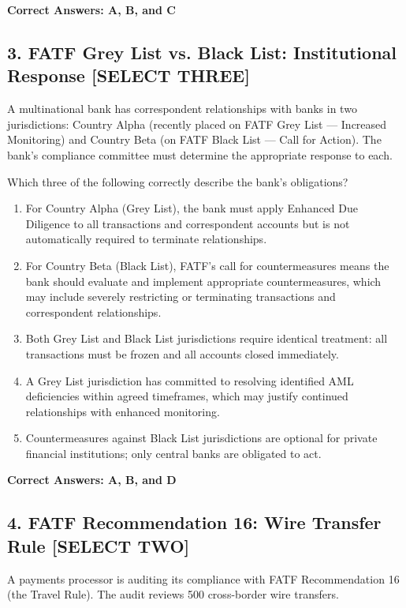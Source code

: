\documentclass[11pt,a4paper]{article}
\begin{document}
	\textbf{Correct Answers: A, B, and C}
	
	\subsection{3. FATF Grey List vs. Black List: Institutional Response \textnormal{[SELECT THREE]}}
	
	A multinational bank has correspondent relationships with banks in two jurisdictions: Country Alpha (recently placed on FATF Grey List — Increased Monitoring) and Country Beta (on FATF Black List — Call for Action). The bank's compliance committee must determine the appropriate response to each.
	
	Which three of the following correctly describe the bank's obligations?
	
	\begin{enumerate}[label=\Alph*.]
		\item For Country Alpha (Grey List), the bank must apply Enhanced Due Diligence to all transactions and correspondent accounts but is not automatically required to terminate relationships.
		\item For Country Beta (Black List), FATF's call for countermeasures means the bank should evaluate and implement appropriate countermeasures, which may include severely restricting or terminating transactions and correspondent relationships.
		\item Both Grey List and Black List jurisdictions require identical treatment: all transactions must be frozen and all accounts closed immediately.
		\item A Grey List jurisdiction has committed to resolving identified AML deficiencies within agreed timeframes, which may justify continued relationships with enhanced monitoring.
		\item Countermeasures against Black List jurisdictions are optional for private financial institutions; only central banks are obligated to act.
	\end{enumerate}
	
	\textbf{Correct Answers: A, B, and D}
	
	\subsection{4. FATF Recommendation 16: Wire Transfer Rule \textnormal{[SELECT TWO]}}
	
	A payments processor is auditing its compliance with FATF Recommendation 16 (the Travel Rule). The audit reviews 500 cross-border wire transfers.
	
\end{document}
